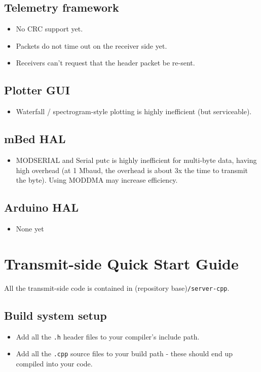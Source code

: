 \documentclass[11pt]{article}
\begin{document}
\subsection{Telemetry framework}
\begin{itemize}
  \item No CRC support yet.
  \item Packets do not time out on the receiver side yet.
  \item Receivers can't request that the header packet be re-sent.
\end{itemize}

\subsection{Plotter GUI}
\begin{itemize}
  \item Waterfall / spectrogram-style plotting is highly inefficient (but serviceable).
\end{itemize}

\subsection{mBed HAL}
\begin{itemize}
  \item MODSERIAL and Serial putc is highly inefficient for multi-byte data, having high overhead (at 1 Mbaud, the overhead is about 3x the time to transmit the byte). Using MODDMA may increase efficiency.
\end{itemize}

\subsection{Arduino HAL}
\begin{itemize}
  \item None yet
\end{itemize}

\section{Transmit-side Quick Start Guide}
All the transmit-side code is contained in (repository base)\texttt{/server-cpp}.

\subsection{Build system setup}
\begin{itemize}
  \item Add all the \texttt{.h} header files to your compiler's include path.
  \item Add all the \texttt{.cpp} source files to your build path - these should end up compiled into your code.
\end{itemize}
\end{document}

